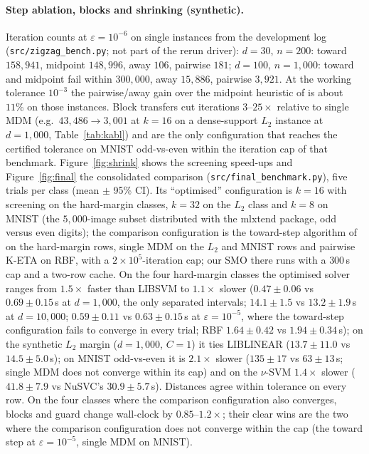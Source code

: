 \documentclass[pdflatex,sn-apa]{sn-jnl}%
\theoremstyle{thmstyleone}
\theoremstyle{thmstyletwo}
\begin{document}
\paragraph{Step ablation, blocks and shrinking (synthetic).} Iteration
counts at $\varepsilon=10^{-6}$ on single instances from the
development log (\texttt{src/zigzag\_bench.py}; not part of the
rerun driver): $d{=}30$, $n{=}200$:
toward $158{,}941$, midpoint $148{,}996$, away $106$, pairwise $181$;
$d{=}100$, $n{=}1{,}000$: toward and midpoint fail within $300{,}000$,
away $15{,}886$, pairwise $3{,}921$. At the working tolerance $10^{-3}$
the pairwise/away gain over the midpoint heuristic of
\citet{gupta2026} is about $11\%$ on those instances. Block transfers
cut iterations $3$--$25\times$ relative to single MDM (e.g.\
$43{,}486\to3{,}001$ at $k{=}16$ on a dense-support $L_2$ instance at
$d{=}1{,}000$, Table~\ref{tab:kabl})
and are the only configuration that reaches the certified tolerance on
MNIST odd-vs-even within the iteration cap of that benchmark.
Figure~\ref{fig:shrink} shows the screening
speed-ups and Figure~\ref{fig:final} the consolidated comparison
(\texttt{src/final\_benchmark.py}), five trials per class (mean $\pm$
95\% CI). Its ``optimised'' configuration is $k{=}16$ with screening on
the hard-margin classes, $k{=}32$ on the $L_2$ class and $k{=}8$ on
MNIST (the $5{,}000$-image subset distributed with the mlxtend package,
odd versus even digits); the comparison configuration is the
toward-step algorithm of \citet{gupta2026} on the hard-margin rows,
single MDM on the $L_2$ and MNIST rows and pairwise K-ETA on RBF, with a
$2\times10^5$-iteration cap; our SMO there runs with a
$300$\,s cap and a two-row cache. On the four hard-margin
classes the optimised solver ranges from $1.5\times$ faster than LIBSVM
to $1.1\times$ slower ($0.47\pm0.06$ vs $0.69\pm0.15$\,s at
$d{=}1{,}000$, the only separated intervals; $14.1\pm1.5$ vs
$13.2\pm1.9$\,s at $d{=}10{,}000$; $0.59\pm0.11$ vs $0.63\pm0.15$\,s at
$\varepsilon{=}10^{-5}$, where the toward-step configuration fails to
converge in every trial; RBF $1.64\pm0.42$ vs $1.94\pm0.34$\,s); on the
synthetic $L_2$ margin ($d{=}1{,}000$, $C{=}1$) it ties LIBLINEAR
($13.7\pm11.0$ vs $14.5\pm5.0$\,s); on MNIST odd-vs-even it is
$2.1\times$ slower ($135\pm17$ vs $63\pm13$\,s; single MDM does not
converge within its cap) and on the $\nu$-SVM $1.4\times$ slower
($41.8\pm7.9$ vs NuSVC's $30.9\pm5.7$\,s). Distances agree within
tolerance on every row. On the four classes where the comparison
configuration also converges, blocks and guard change wall-clock by
$0.85$--$1.2\times$;
their clear wins are the two where the comparison configuration does not
converge within the cap (the toward step at $\varepsilon=10^{-5}$, single
MDM on MNIST).
\end{document}

